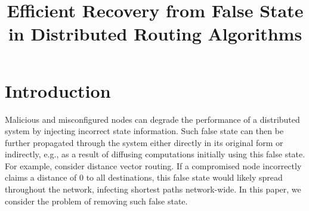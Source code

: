 \documentclass[10pt,conference]{IEEEtran}
\newcommand{\doctitle}{Efficient Recovery from False State in Distributed Routing Algorithms}
\begin{document}
\title{\doctitle}


\author{
} 

\maketitle



\section{Introduction}
\label{sec:intro}


Malicious and misconfigured nodes can degrade the performance of a distributed system by injecting incorrect state information. Such false state can then be further propagated 
through the system either directly in its original form or indirectly, e.g., as a result of diffusing computations initially using this false state. 
For example, consider distance vector routing.  If a compromised node incorrectly claims a distance of $0$ to all destinations, this false state would likely
spread throughout the network, infecting shortest paths network-wide.
In this paper, we consider the problem of removing such false state. %
\end{document}
